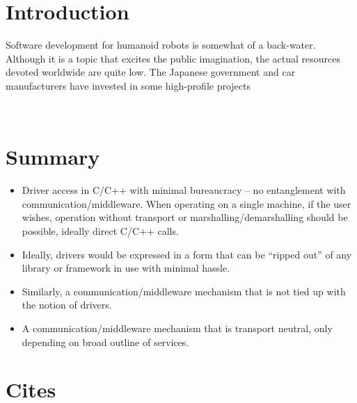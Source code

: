 
\section{Introduction}


Software development for humanoid robots is somewhat of a back-water.
Although it is a topic that excites the public imagination, the
actual resources devoted worldwide are quite low.  The Japanese
government and car manufacturers have invested in some high-profile
projects





\ \\
\newpage


\section{Summary}

\begin{itemize}

\item Driver access in C/C++ with minimal bureaucracy -- no
entanglement with communication/middleware.  When operating
on a single machine, if the user wishes, operation without
transport or marshalling/demarshalling should be possible, ideally
direct C/C++ calls.

\item Ideally, drivers would be expressed in a form that
can be ``ripped out'' of any library or framework in use
with minimal hassle.

\item Similarly, a communication/middleware mechanism that is 
not tied up with the notion of drivers.

\item A communication/middleware mechanism that is transport
neutral, only depending on broad outline of services.



\end{itemize}


\section{Cites}

\cite{kramer2007development}

\cite{gerkey03player}

